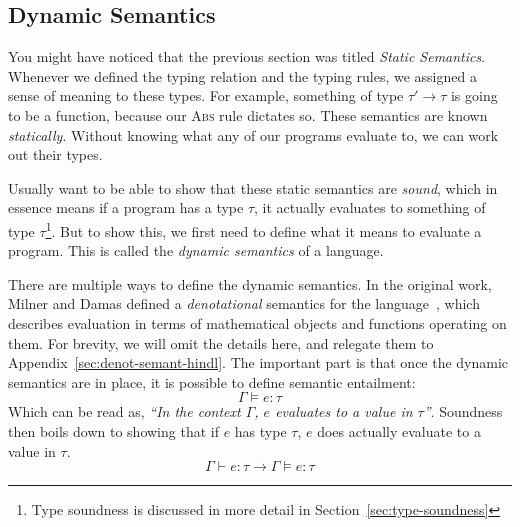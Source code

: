 \subsection{Dynamic Semantics}

You might have noticed that the previous section was titled
\textit{Static Semantics}. Whenever we defined the typing relation and
the typing rules, we assigned a sense of meaning to these types. For
example, something of type $\tau' \rightarrow \tau$ is going to be a function, because
our \textsc{Abs} rule dictates so. These semantics are known
\emph{statically}. Without knowing what any of our programs evaluate
to, we can work out their types.

Usually want to be able to show that these static semantics are
\emph{sound}, which in essence means if a program has a type $\tau$, it
actually evaluates to something of type $\tau$\footnote{Type soundness is
  discussed in more detail in Section~\ref{sec:type-soundness}}. But
to show this, we first need to define what it means to evaluate a
program. This is called the \emph{dynamic semantics} of a language.

There are multiple ways to define the dynamic semantics. In the
original work, Milner and Damas defined a \emph{denotational}
semantics for the language~\cite{milner1978,damas1984}, which
describes evaluation in terms of mathematical objects and functions
operating on them. For brevity, we will omit the details here, and
relegate them to Appendix~\ref{sec:denot-semant-hindl}. The
important part is that once the dynamic semantics are in place, it is
possible to define semantic entailment:
\[ \Gamma \vDash e : \tau \]
Which can be read as, \textsl{``In the context $\Gamma$, $e$ evaluates to a
  value in $\tau$''}. Soundness then boils down to showing that
if $e$ has type $\tau$, $e$ does actually evaluate to a value in $\tau$.
\[ \Gamma \vdash e : \tau \rightarrow \Gamma \vDash e : \tau \]


